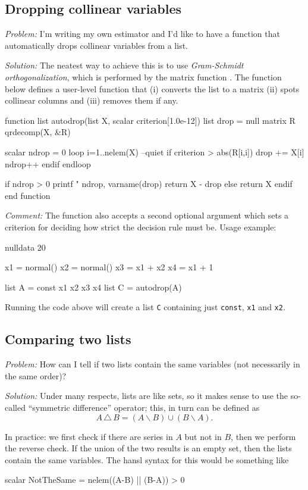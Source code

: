 \subsection{Dropping collinear variables}

\emph{Problem:} I'm writing my own estimator and I'd like to have a
function that automatically drops collinear variables from a list.

\emph{Solution:}
The neatest way to achieve this is to use \emph{Gram-Schmidt
  orthogonalization}, which is performed by the matrix function
. The function below defines a user-level function
that (i) converts the list to a matrix (ii) spots collinear columns
and (iii) removes them if any.

\begin{code}
function list autodrop(list X, scalar criterion[1.0e-12])
    list drop = null
    matrix R
    qrdecomp({X}, &R)

    scalar ndrop = 0
    loop i=1..nelem(X) --quiet
        if criterion > abs(R[i,i])
            drop += X[i]
            ndrop++
        endif
    endloop

    if ndrop > 0 
        printf "%
          ndrop, varname(drop)    
        return X - drop
    else 
        return X
    endif
end function
\end{code}

\emph{Comment:} The function also accepts a second optional argument
which sets a criterion for deciding how strict the decision rule must
be. Usage example:

\begin{code}
nulldata 20

x1 = normal()
x2 = normal()
x3 = x1 + x2
x4 = x1 + 1

list A = const x1 x2 x3 x4
list C = autodrop(A)
\end{code}
Running the code above will create a list \texttt{C} containing just
\texttt{const}, \texttt{x1} and \texttt{x2}.

\subsection{Comparing two lists}

\emph{Problem:} How can I tell if two lists contain the same variables
(not necessarily in the same order)?

\emph{Solution:} Under many respects, lists are like sets, so it makes
sense to use the so-called ``symmetric difference'' operator; this, in
turn can be defined as
\[
A\,\triangle\,B = (A \backslash B) \cup (B \backslash A) .
\]

In practice: we first check if there are series in $A$ but not in $B$,
then we perform the reverse check. If the union of the two results is
an empty set, then the lists contain the same variables. The hansl
syntax for this would be something like

\begin{code}
scalar NotTheSame = nelem((A-B) || (B-A)) > 0
\end{code}

